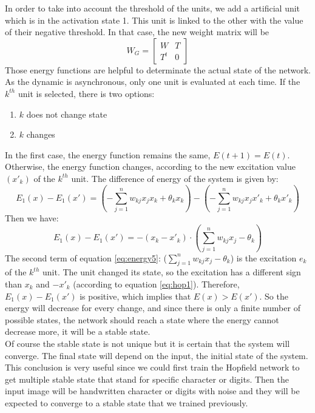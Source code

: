 In order to take into account the threshold of the units, we add a artificial unit which is in the activation state 1. This unit is linked to the other with the value of their negative threshold. In that case, the new weight matrix will be
\begin{equation}
\label{eq:energy3}
W_G = \begin{bmatrix}W & T \\T^t & 0 \end{bmatrix}
\end{equation}
Those energy functions are helpful to determinate the actual state of the network.\\

As the dynamic is asynchronous, only one unit is evaluated at each time. If the $k^{th}$ unit is selected, there is two options:

\begin{enumerate}
  \item $k$ does not change state
  \item $k$ changes 
\end{enumerate}
In the first case, the energy function remains the same, $E(t + 1) = E(t)$. Otherwise, the energy function changes, according to the new excitation value $(x'_k)$ of the $k^{th}$ unit. The difference of energy of the system is given by:
\begin{equation}
\label{eq:energy4}
E_1(x) - E_1(x') = (-\sum_{j = 1}^{n}w_{kj} x_j x_k + \theta_k x_k) - (-\sum_{j = 1}^{n} w_{kj} x_j x'_k + \theta_k x'_{k})
\end{equation}
Then we have:
\begin{equation}
\label{eq:energy5}
E_1(x) - E_1(x') = -(x_k - x'_k) \cdot (\sum_{j = 1}^{n} w_{kj}x_j - \theta_k)
\end{equation}
The second term of equation \ref{eq:energy5}: ($\sum_{j = 1}^{n} w_{kj}x_j - \theta_k$) is the excitation $e_k$ of the $k^{th}$ unit. The unit changed its state, so the excitation has a different sign than $x_k$ and $-x'_k$ (according to equation \ref{eq:hop1}). Therefore, $E_1(x) - E_1(x')$ is positive, which implies that $E(x) > E(x')$.  So the energy will decrease for every change, and since there is only a finite number of possible states, the network should reach a state where the energy cannot decrease more, it will be a stable state.\\

Of course the stable state is not unique but it is certain that the system will converge. The final state will depend on the input, the initial state of the system. This conclusion is very useful since we could first train the Hopfield network to get multiple stable state that stand for specific character or digits. Then the input image will be handwritten character or digits with noise and they will be expected to converge to a stable state that we trained previously. \\

